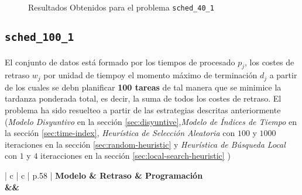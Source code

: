 \documentclass[spanish]{article}
\begin{document}
			\begin{figure}
				\begin{center}
				\end{center}
				\caption{Resultados Obtenidos para el problema \texttt{sched\_40\_1}}
				\label{plot:sol-sched_40_1}
			\end{figure}

		\subsection{\texttt{sched\_100\_1}}

			\paragraph{}
			El conjunto de datos está formado por los tiempos de procesado $p_j$, los costes de retraso $w_j$ por unidad de tiempoy el momento máximo de terminación $d_j$ a partir de los cuales se debn planificar \textbf{100 tareas} de tal manera que se minimice la tardanza ponderada total, es decir, la suma de todos los costes de retraso. El problema ha sido resuelteo a partir de las estrategias descritas anteriormente (\emph{Modelo Disyuntivo} en la sección \ref{sec:disyuntive},\emph{Modelo de Índices de Tiempo} en la sección \ref{sec:time-index}, \emph{Heurística de Selección Aleatoria} con $100$ y $1000$ iteraciones en la sección \ref{sec:random-heuristic} y \emph{Heurística de Búsqueda Local} con $1$ y $4$ iteracciones en la sección \ref{sec:local-search-heuristic} )


			\begin{table}
				\centering
				\begin{tabu}{ | c | c | p{.58\linewidth} |}
					\hline
					\bfseries Modelo & \bfseries Retraso & \bfseries Programación
					{\\\hline\model&\delay&\schedule}
					\\\hline
				\end{tabu}
				\caption{Resultados Obtenidos para el problema \texttt{sched\_100\_1}}
				\label{table:sol-sched_100_1}
			\end{table}
\end{document}
